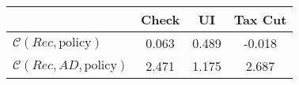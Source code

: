 \begin{tabular}{@{}lccc@{}}
\toprule
                          & Check      & UI    & Tax Cut    \\  \midrule
$\mathcal{C}(Rec,\text{policy})$ & 0.063  & 0.489  & -0.018     \\
$\mathcal{C}(Rec, AD,\text{policy})$ & 2.471  & 1.175  & 2.687     \\
\end{tabular}
